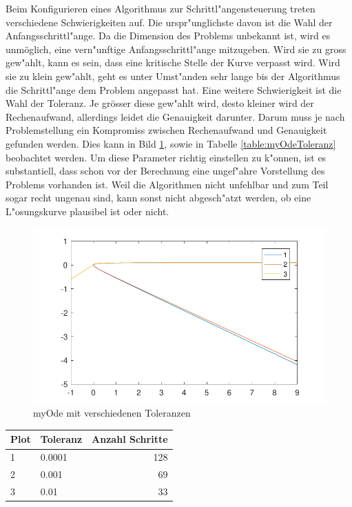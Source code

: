 \begin{refsection}
Beim Konfigurieren eines Algorithmus zur Schrittl"angensteuerung treten verschiedene Schwierigkeiten auf.
Die urspr"unglichste davon ist die Wahl der Anfangsschrittl"ange.
Da die Dimension des Problems unbekannt ist, wird es unmöglich, eine vern"unftige Anfangsschrittl"ange mitzugeben.
Wird sie zu gross gew"ahlt, kann es sein, dass eine kritische Stelle der Kurve verpasst wird.
Wird sie zu klein gew"ahlt, geht es unter Umst"anden sehr lange bis der Algorithmus die Schrittl"ange dem Problem angepasst hat.
Eine weitere Schwierigkeit ist die Wahl der Toleranz.
Je grösser diese gew"ahlt wird, desto kleiner wird der Rechenaufwand, allerdings leidet die Genauigkeit darunter.
Darum muss je nach Problemstellung ein Kompromiss zwischen Rechenaufwand und Genauigkeit gefunden werden.
Dies kann in Bild \ref{image:myOdeToleranz}, sowie in Tabelle \ref{table:myOdeToleranz} beobachtet werden.
Um diese Parameter richtig einstellen zu k"onnen, ist es substantiell, dass schon vor der Berechnung eine ungef"ahre Vorstellung des Problems vorhanden ist.
Weil die Algorithmen nicht unfehlbar und zum Teil sogar recht ungenau sind, kann sonst nicht abgesch"atzt werden, ob eine L"osungskurve plausibel ist oder nicht.
\begin{figure}
\centering
\includegraphics{schrittlaenge/images/myOdeToleranz.pdf}
\caption{myOde mit verschiedenen Toleranzen}
\label{image:myOdeToleranz}
\end{figure}
\begin{table}
\centering
\begin{tabular}{|l|l|r|}
\hline
Plot & Toleranz & Anzahl Schritte\\ \hline
1 & 0.0001 & 128\\ \hline
2 & 0.001 & 69\\ \hline
3 & 0.01 & 33\\ \hline

\end{tabular}
\end{table}
\end{refsection}
